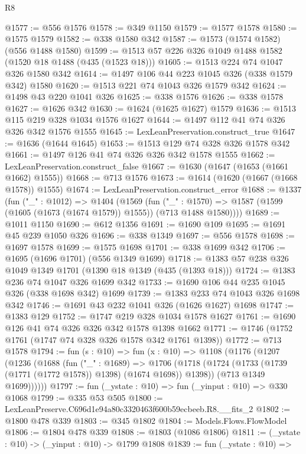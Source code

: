 \begin{lexlean}{R8}
\begin{coremodule}
@1577 := @556 @1576
@1578 := @349 @1150
@1579 := @1577 @1578
@1580 := @1575 @1579
@1582 := @338 @1580 @342
@1587 := @1573 (@1574 @1582) (@556 @1488 @1580)
@1599 := @1513 @57 @226 @326 @1049 @1488 @1582 (@1520 @18 @1488 (@435 (@1523 @18)))
@1605 := @1513 @224 @74 @1047 @326 @1580 @342
@1614 := @1497 @106 @44 @223 @1045 @326 (@338 @1579 @342) @1580
@1620 := @1513 @221 @74 @1043 @326 @1579 @342
@1624 := @1498 @43 @220 @1041 @326
@1625 := @338 @1576
@1626 := @338 @1578
@1627 := @1626 @342
@1630 := @1624 (@1625 @1627) @1579
@1636 := @1513 @115 @219 @328 @1034 @1576 @1627
@1644 := @1497 @112 @41 @74 @326 @326 @342 @1576 @1555
@1645 := LexLeanPreservation.construct_true
@1647 := @1636 (@1644 @1645)
@1653 := @1513 @129 @74 @328 @326 @1578 @342
@1661 := @1497 @126 @41 @74 @326 @326 @342 @1578 @1555
@1662 := LexLeanPreservation.construct_false
@1667 := @1630 (@1647 (@1653 (@1661 @1662) @1555))
@1668 := @713 @1576
@1673 := @1614 (@1620 (@1667 (@1668 @1578)) @1555)
@1674 := LexLeanPreservation.construct_error
@1688 := @1337
    (fun ("_" : @1012) =>
    @1404
      (@1569
        (fun ("_" : @1570) =>
        @1587 (@1599 (@1605 (@1673 (@1674 @1579)) @1555)) (@713 @1488 @1580))))
@1689 := @1011 @1150
@1690 := @612 @1356
@1691 := @1690 @109
@1695 := @1691 @45 @239 @1050 @326
@1696 := @338 @1349
@1697 := @556 @1578
@1698 := @1697 @1578
@1699 := @1575 @1698
@1701 := @338 @1699 @342
@1706 := @1695 (@1696 @1701) (@556 @1349 @1699)
@1718 := @1383 @57 @238 @326 @1049 @1349 @1701 (@1390 @18 @1349 (@435 (@1393 @18)))
@1724 := @1383 @236 @74 @1047 @326 @1699 @342
@1733 := @1690 @106 @44 @235 @1045 @326 (@338 @1698 @342) @1699
@1739 := @1383 @233 @74 @1043 @326 @1698 @342
@1746 := @1691 @43 @232 @1041 @326 (@1626 @1627) @1698
@1747 := @1383 @129
@1752 := @1747 @219 @328 @1034 @1578 @1627
@1761 := @1690 @126 @41 @74 @326 @326 @342 @1578 @1398 @1662
@1771 := @1746 (@1752 @1761 (@1747 @74 @328 @326 @1578 @342 @1761 @1398))
@1772 := @713 @1578
@1794 := fun (s : @10) =>
  fun (x : @10) =>
  @1108
    (@1176
      (@1207
        (@1236
          (@1688
            (fun ("_" : @1689) =>
            @1706
              (@1718 (@1724 (@1733 (@1739 (@1771 (@1772 @1578)) @1398) (@1674 @1698)) @1398))
              (@713 @1349 @1699))))))
@1797 := fun (_ystate : @10) => fun (_yinput : @10) => @330 @1068
@1799 := @335 @53 @505
@1800 := LexLeanPreserve.C696d1e94a80c3320463f600b59ecbeeb.R8.__fits_2
@1802 := @1800 @478 @339
@1803 := @345 @1802
@1804 := Models.Flows.FlowModel
@1806 := @1804 @478 @339
@1808 := @1803 (@1086 @1806)
@1811 := (_ystate : @10) -> (_yinput : @10) -> @1799 @1808
@1839 := fun (_ystate : @10) =>

\end{coremodule}
\end{lexlean}
